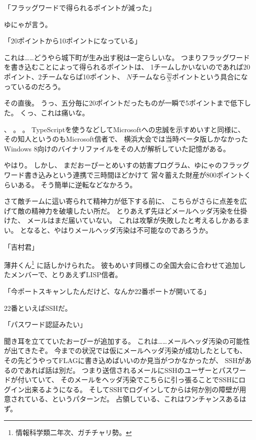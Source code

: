 「フラッグワードで得られるポイントが減った」

ゆにゃが言う。

「20ポイントから10ポイントになっている」

これは……どうやら城下町が生み出す税は一定らしいな。
つまりフラッグワードを書き込むことによって得られるポイントは、
1チームしかいないのであれば20ポイント、2チームならば10ポイント、
$N$チームなら$\frac{20}{N}$ポイントという具合になっているのだろう。

その直後。
うっ、五分毎に20ポイントだったものが一瞬で5ポイントまで低下した。
くっ、これは痛いな。

、
。
。
TypeScriptを使うなどしてMicrosoftへの忠誠を示すめいすと同様に、
その知人というのもMicrosoft信者で、
横浜大会では当時ベータ版しかなかったWindows 8向けのバイナリファイルをその人が解析していた記憶がある。

やはり。
しかし、
まだおーぴーとめいすの妨害プログラム、ゆにゃのフラッグワード書き込みという連携で三時間ほどかけて
営々蓄えた財産が800ポイントくらいある。
そう簡単に逆転などなかろう。

さて敵チームに這い寄られて精神力が低下する前に、
こちらがさらに点差を広げて敵の精神力を破壊したい所だ。
とりあえず先ほどメールヘッダ汚染を仕掛けた、
メールはまだ届いていない。
これは攻撃が失敗したと考えるしかあるまい。
となると、やはりメールヘッダ汚染は不可能なのであろうか。

「吉村君」

薄井くん\footnote{情報科学類二年次、ガチチャリ勢。}%
に話しかけられた。
彼もめいす同様この全国大会に合わせて追加したメンバーで、とりあえずLISP信者。

「今ポートスキャンしたんだけど、なんか22番ポートが開いてる」

22番といえばSSHだ。

「パスワード認証みたい」

聞き耳を立てていたおーぴーが追加する。
これは……メールヘッダ汚染の可能性が出てきたぞ。
今までの状況では仮にメールヘッダ汚染が成功したとしても、
その先どうやってFLAGに書き込めばいいのか見当がつかなかったが、
SSHがあるのであれば話は別だ。
つまり送信されるメールにSSHのユーザーとパスワードが付いていて、
そのメールをヘッダ汚染でこちらに引っ張ることでSSHにログイン出来るようになる。
そしてSSHでログインしてからは何か別の障壁が用意されている、というパターンだ。
占領している、これはワンチャンスあるはず。

